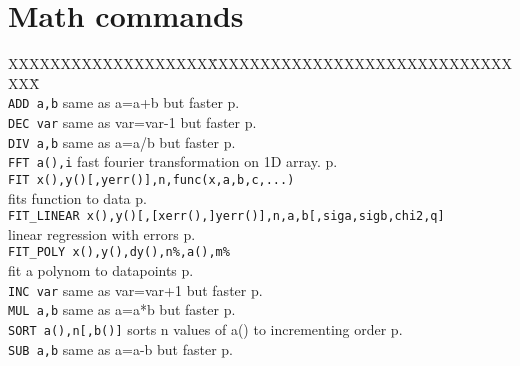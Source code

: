 \section{Math commands}
\begin{tabbing}
XXXXXXXXXXXXXXXXXXX\=XXXXXXXXXXXXXXXXXXXXXXXXXXXXXXXX\=\kill\\
\verb|ADD a,b| 		\> same as a=a+b but faster\> p.\pageref{ADD}\\
\verb|DEC var| 		\> same as var=var-1 but faster\> p.\pageref{DEC}\\
\verb|DIV a,b| 		\> same as a=a/b but faster\> p.\pageref{DIV}\\
\verb|FFT a(),i|	\>fast fourier transformation on 1D array.\> p.\pageref{FFT}\\
\verb|FIT x(),y()[,yerr()],n,func(x,a,b,c,...)| \> \\
			\> fits function to data\> p.\pageref{FIT}\\
\verb|FIT_LINEAR x(),y()[,[xerr(),]yerr()],n,a,b[,siga,sigb,chi2,q]|\> \\
			\> linear regression with errors\> p.\pageref{FITiLINEAR}\\
\verb|FIT_POLY x(),y(),dy(),n%,a(),m%|\> \\
			\> fit a polynom to datapoints\> p.\pageref{FITiPOLY}\\
\verb|INC var| 		\> same as var=var+1 but faster\> p.\pageref{INC}\\
\verb|MUL a,b| 		\> same as a=a*b but faster\> p.\pageref{MUL}\\
\verb|SORT a(),n[,b()]|	\> sorts n values of a() to incrementing order\> p.\pageref{SORT}\\
\verb|SUB a,b|		\> same as a=a-b but faster\> p.\pageref{SUB}\\
\end{tabbing}


